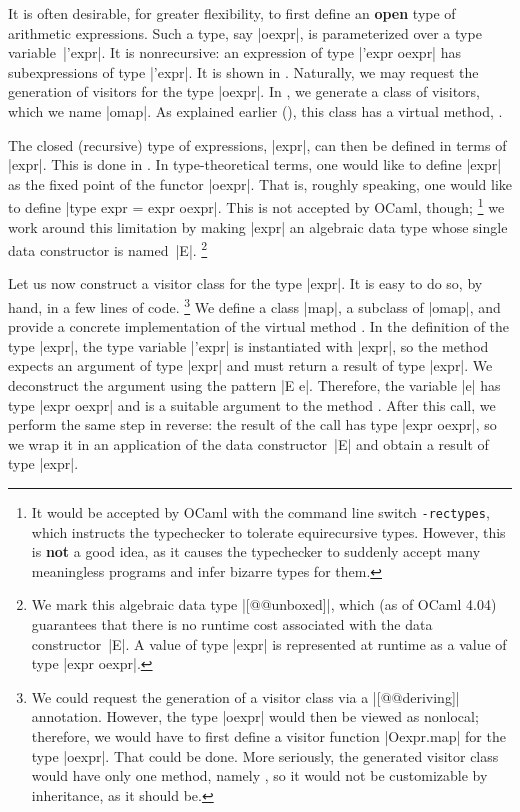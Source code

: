 \documentclass[11pt,a4paper,twoside]{article}
\renewcommand{\emph}[1]{\textbf{#1}}
\begin{document}
It is often desirable, for greater flexibility, to first define an \emph{open}
type of arithmetic expressions. Such a type, say \oc|oexpr|, is parameterized
over a type variable~\oc|'expr|. It is nonrecursive: an expression of type
\oc|'expr oexpr| has subexpressions of type \oc|'expr|. It is shown in
. Naturally, we may request the generation of visitors for
the type \oc|oexpr|. In , we generate a class of \map
visitors, which we name \oc|omap|. As explained earlier
(), this class has a virtual method,
.

The closed (recursive) type of expressions, \oc|expr|, can then be defined in
terms of \oc|expr|. This is done in . In type-theoretical
terms, one would like to define \oc|expr| as the fixed point of the functor
\oc|oexpr|.
That is, roughly speaking, one would like to define \oc|type expr = expr oexpr|.
This is not accepted by OCaml, though;%
%
\footnote{It would be accepted by OCaml with the command line switch
  \texttt{-rectypes}, which instructs the typechecker to tolerate
  equirecursive types. However, this is \emph{not} a good idea, as it causes
  the typechecker to suddenly accept many meaningless programs and infer
  bizarre types for them.}
%
we work around this limitation by making \oc|expr| an algebraic data type
whose single data constructor is named~\oc|E|.%
%
\footnote{We mark this algebraic data type \oc|[@@unboxed]|, which (as of
  OCaml 4.04) guarantees that there is no runtime cost associated with the
  data constructor~\oc|E|. A value of type \oc|expr| is represented at
  runtime as a value of type \oc|expr oexpr|.}

Let us now construct a visitor class for the type \oc|expr|. It is easy to
do so, by hand, in a few lines of code.%
%
\footnote{We could request the generation of a visitor class via a
  \oc|[@@deriving]| annotation. However, the type \oc|oexpr| would then be
  viewed as nonlocal; therefore, we would have to first define a visitor
  function \oc|Oexpr.map| for the type \oc|oexpr|. That could be done. More
  seriously, the generated visitor class would have only one method, namely
  , so it would not be customizable by inheritance, as it
  should be.}
%
We define a class \oc|map|, a subclass of \oc|omap|, and provide a concrete
implementation of the virtual method . In the definition
of the type \oc|expr|, the type variable \oc|'expr| is instantiated with
\oc|expr|, so the method  expects an argument of type
\oc|expr| and must return a result of type \oc|expr|. We deconstruct the
argument using the pattern \oc|E e|. Therefore, the variable \oc|e| has type
\oc|expr oexpr| and is a suitable argument to the method .
After this call, we perform the same step in reverse: the result of the call
has type \oc|expr oexpr|, so we wrap it in an application of the data
constructor~\oc|E| and obtain a result of type \oc|expr|.
\end{document}
